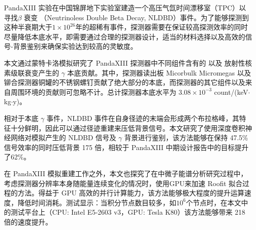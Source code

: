 
\begin{cabstract}
	\pkuthssffaq %
	PandaXIII 实验在中国锦屏地下实验室建造一个高压气氙时间漂移室（TPC）以寻找 $\beta$ 衰变 （Neutrinoless Double Beta Decay, NLDBD）事件。为了能够探测到这种半衰期大于$1\times10^{26}$年的超稀有事件，探测器需要在保证较高探测效率的同时尽量降低本底水平，即需要通过合理的探测器设计，适当的材料选择以及高效的信号-背景鉴别来确保实验达到较高的灵敏度。

	本文通过蒙特卡洛模拟研究了 PandaXIII 探测器中不同组件含有的 \utte 以及 \thttt 放射性核素级联衰变产生的 $\gamma$ 本底贡献。其中，探测器读出板 Micorbulk Micromegas 以及铆合探测器铜罐的不锈钢螺钉贡献了绝大部分的本底，而探测器的其它组件以及来自周围环境的贡献则可忽略不计。总计探测器本底水平为 $3.08\times 10^{-3}$ count/(keV$\cdot$kg$\cdot$y)。

	相对于本底 $\gamma$ 事件，NLDBD 事件在自身径迹的末端会形成两个布拉格峰，其特征十分鲜明，因此可以通过径迹重建来压低背景信号。本文研究了使用深度卷积神经网络对模拟产生的 NLDBD 信号及 $\gamma$ 背景进行鉴别，该方法能够在保持 47.5\% 信号效率的同时压低背景 175 倍，相较于 PandaXIII 中期设计报告中的目标提升了62\%。

	在 PandaXIII 模拟重建工作之外，本文也探究了在中微子能谱分析研究过程中，考虑探测器分辨率本身随能量连续变化的情况时，使用GPU来加速 Roofit 拟合过程的方法。得益于 GPU 高效的并行计算能力，该方法能够极大程度的提升运算速度，降低时间消耗。测试显示：当积分节点数目较多，如$10^6$个节点时，在本文中的测试平台上（CPU: Intel E5-2603 v3，GPU: Tesla K80）该方法能够带来 218 倍的速度提升。

\end{cabstract}

